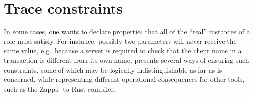 
\chapter{Trace constraints}
\label{chap:trace:constraints}

In some cases, one wants to declare properties that all of the
``real'' instances of a role must satisfy.  For instance, possibly two
parameters will never receive the same value, e.g.~because a server is
required to check that the client name in a transaction is different
from its own name.  {\cpsa} presents several ways of ensuring such
constraints, some of which may be logically indistinguishable as far
as {\cpsa} is concerned, while representing different operational
consequences for other tools, such as the Zappa {\cpsa}-to-Rust
compiler.


